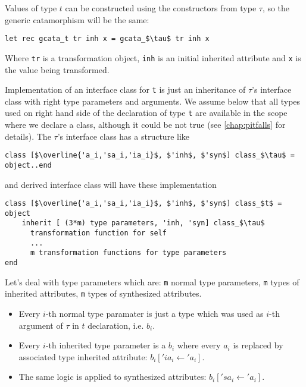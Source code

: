 \documentclass[acmsmall,review,anonymous]{acmart}\settopmatter{printfolios=true,printccs=false,printacmref=false}
\begin{document}
Values of type $t$ can be constructed using the constructors from type $\tau$, so the generic catamorphism will be the same:
\begin{lstlisting}
let rec gcata_t tr inh x = gcata_$\tau$ tr inh x
\end{lstlisting}
Where \lstinline{tr} is a transformation object, \lstinline{inh} is an initial inherited attribute and \lstinline{x} is the value being transformed.

Implementation of an interface class for \lstinline{t} is just an inheritance of  $\tau$'s interface class with right type parameters and arguments. We assume below that all types used on right hand side of the declaration of type \lstinline{t} are available in the scope where we declare a class, although it could be not true (see \autoref{chap:pitfalls} for details). The $\tau$'s interface class has a structure like
\begin{lstlisting}
class [$\overline{'a_i,'sa_i,'ia_i}$, $'inh$, $'syn$] class_$\tau$ = object..end
\end{lstlisting}
and derived interface class will have these implementation
\begin{lstlisting}
class [$\overline{'a_i,'sa_i,'ia_i}$, $'inh$, $'syn$] class_$t$ = object
    inherit [ (3*m) type parameters, 'inh, 'syn] class_$\tau$ 
      transformation function for self
      ...
      m transformation functions for type parameters
end
\end{lstlisting}
Let's deal with type parameters which are: \lstinline{m} normal type parameters, \lstinline{m} types of inherited attributes, \lstinline{m} types of synthesized attributes. 
\begin{itemize}
 \item Every $i$-th normal type paramater is just a type which was used as $i$-th argument of $\tau$ in $t$ declaration, i.e. $b_i$.
 \item Every $i$-th inherited type parameter is a $b_i$ where every $a_i$ is replaced by associated type inherited attribute:  $b_i['ia_i \gets \!'a_i]$.
 \item The same logic is applied to synthesized attributes: $b_i['sa_i \gets \!'a_i]$.
\end{itemize}
\end{document}
